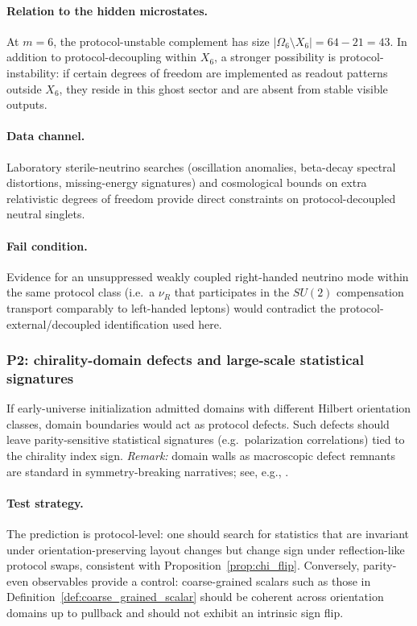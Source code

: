 \paragraph{Relation to the hidden microstates.}
At $m=6$, the protocol-unstable complement has size $|\Omega_6\setminus X_6|=64-21=43$.
In addition to protocol-decoupling within $X_6$, a stronger possibility is protocol-instability: if certain degrees of freedom are implemented as readout patterns outside $X_6$, they reside in this ghost sector and are absent from stable visible outputs.

\paragraph{Data channel.}
Laboratory sterile-neutrino searches (oscillation anomalies, beta-decay spectral distortions, missing-energy signatures) and cosmological bounds on extra relativistic degrees of freedom provide direct constraints on protocol-decoupled neutral singlets.

\paragraph{Fail condition.}
Evidence for an unsuppressed weakly coupled right-handed neutrino mode within the same protocol class (i.e.\ a $\nu_R$ that participates in the $SU(2)$ compensation transport comparably to left-handed leptons) would contradict the protocol-external/decoupled identification used here.

\subsubsection{P2: chirality-domain defects and large-scale statistical signatures}
\label{subsec:p2_domain_walls}

If early-universe initialization admitted domains with different Hilbert orientation classes, domain boundaries would act as protocol defects.
Such defects should leave parity-sensitive statistical signatures (e.g.\ polarization correlations) tied to the chirality index sign.
\emph{Remark:} domain walls as macroscopic defect remnants are standard in symmetry-breaking narratives; see, e.g., \cite{VilenkinShellard1994,ZeldovichKobzarevOkun1974}.
\paragraph{Test strategy.}
The prediction is protocol-level: one should search for statistics that are invariant under orientation-preserving layout changes but change sign under reflection-like protocol swaps, consistent with Proposition~\ref{prop:chi_flip}.
Conversely, parity-even observables provide a control: coarse-grained scalars such as those in Definition~\ref{def:coarse_grained_scalar} should be coherent across orientation domains up to pullback and should not exhibit an intrinsic sign flip.

